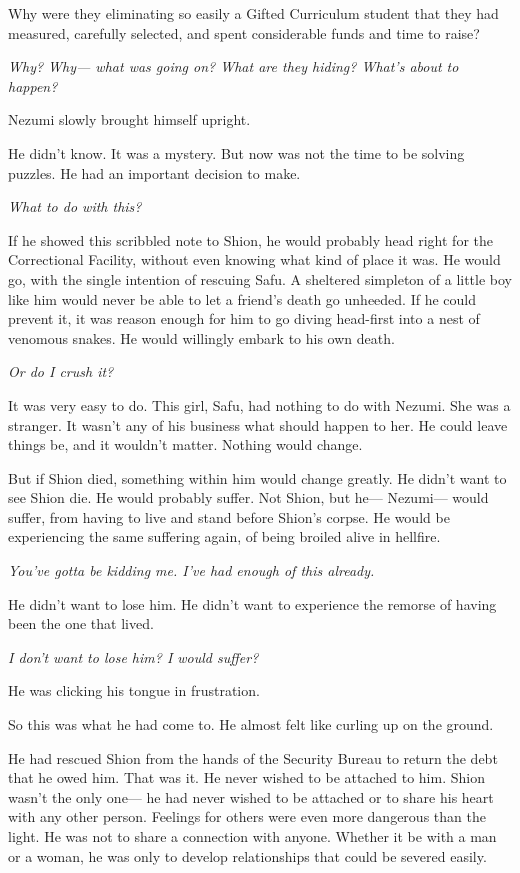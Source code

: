 Why were they eliminating so easily a Gifted Curriculum student that
they had measured, carefully selected, and spent considerable funds and
time to raise?

\emph{Why? Why--- what was going on? What are they hiding? What's about to
happen?}

Nezumi slowly brought himself upright.

He didn't know. It was a mystery. But now was not the time to be solving
puzzles. He had an important decision to make.

\emph{What to do with this?}

If he showed this scribbled note to Shion, he would probably head right
for the Correctional Facility, without even knowing what kind of place
it was. He would go, with the single intention of rescuing Safu. A
sheltered simpleton of a little boy like him would never be able to let
a friend's death go unheeded. If he could prevent it, it was reason
enough for him to go diving head-first into a nest of venomous snakes.
He would willingly embark to his own death.

\emph{Or do I crush it?}

It was very easy to do. This girl, Safu, had nothing to do with Nezumi.
She was a stranger. It wasn't any of his business what should happen to
her. He could leave things be, and it wouldn't matter. Nothing would
change.

But if Shion died, something within him would change greatly. He didn't
want to see Shion die. He would probably suffer. Not Shion, but he---
Nezumi--- would suffer, from having to live and stand before Shion's
corpse. He would be experiencing the same suffering again, of being
broiled alive in hellfire.

\emph{You've gotta be kidding me. I've had enough of this already.}

He didn't want to lose him. He didn't want to experience the remorse of
having been the one that lived.

\emph{I don't want to lose him? I would suffer?}

He was clicking his tongue in frustration.

So this was what he had come to. He almost felt like curling up on the
ground.

He had rescued Shion from the hands of the Security Bureau to return the
debt that he owed him. That was it. He never wished to be attached to
him. Shion wasn't the only one--- he had never wished to be attached or to
share his heart with any other person. Feelings for others were even
more dangerous than the light. He was not to share a connection with
anyone. Whether it be with a man or a woman, he was only to develop
relationships that could be severed easily.


